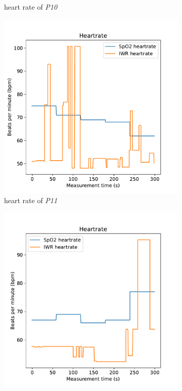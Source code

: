 \begin{figure}[t]
\begin{subfigure}{.45\textwidth}
  \caption{heart rate of \emph{P10}}
  \label{fig:nick4_heart}
\end{subfigure}
\begin{subfigure}{.45\textwidth}
  \centering
  \includegraphics[width=\linewidth]{figures/validation/pascal4_heart.pdf}  
  \caption{heart rate of \emph{P11}}
  \label{fig:pascal4_heart}
\end{subfigure}
\begin{subfigure}{.45\textwidth}
  \centering
  \includegraphics[width=\linewidth]{figures/validation/romy4_heart.pdf}  

\end{subfigure}
\end{figure}
